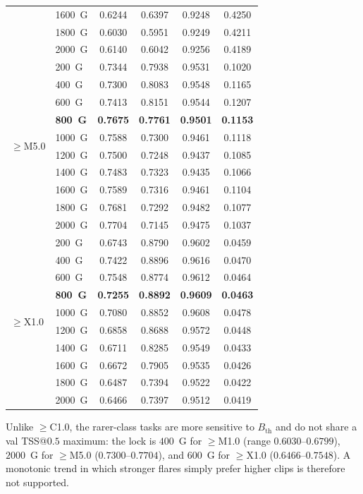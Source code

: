 \documentclass[universe,article,submit,moreauthors]{Definitions/mdpi}
\newif\ifrevision
\newcommand{\add}[1]{\ifrevision\textcolor{blue}{#1}\else#1\fi}
\begin{document}
\begin{table}[!htbp]
\begin{tabular*}{\textwidth}{@{\extracolsep{\fill}}llcccc@{}}
 & 1600~G & 0.6244 & 0.6397 & 0.9248 & 0.4250 \\
 & 1800~G & 0.6030 & 0.5951 & 0.9249 & 0.4211 \\
 & 2000~G & 0.6140 & 0.6042 & 0.9256 & 0.4189 \\
\midrule
\multirow{10}{*}{$\geq$M5.0} & 200~G & 0.7344 & 0.7938 & 0.9531 & 0.1020 \\
 & 400~G & 0.7300 & 0.8083 & 0.9548 & 0.1165 \\
 & 600~G & 0.7413 & 0.8151 & 0.9544 & 0.1207 \\
 & \textbf{800~G} & \textbf{0.7675} & \textbf{0.7761} & \textbf{0.9501} & \textbf{0.1153} \\
 & 1000~G & 0.7588 & 0.7300 & 0.9461 & 0.1118 \\
 & 1200~G & 0.7500 & 0.7248 & 0.9437 & 0.1085 \\
 & 1400~G & 0.7483 & 0.7323 & 0.9435 & 0.1066 \\
 & 1600~G & 0.7589 & 0.7316 & 0.9461 & 0.1104 \\
 & 1800~G & 0.7681 & 0.7292 & 0.9482 & 0.1077 \\
 & 2000~G & 0.7704 & 0.7145 & 0.9475 & 0.1037 \\
\midrule
\multirow{10}{*}{$\geq$X1.0} & 200~G & 0.6743 & 0.8790 & 0.9602 & 0.0459 \\
 & 400~G & 0.7422 & 0.8896 & 0.9616 & 0.0470 \\
 & 600~G & 0.7548 & 0.8774 & 0.9612 & 0.0464 \\
 & \textbf{800~G} & \textbf{0.7255} & \textbf{0.8892} & \textbf{0.9609} & \textbf{0.0463} \\
 & 1000~G & 0.7080 & 0.8852 & 0.9608 & 0.0478 \\
 & 1200~G & 0.6858 & 0.8688 & 0.9572 & 0.0448 \\
 & 1400~G & 0.6711 & 0.8285 & 0.9549 & 0.0433 \\
 & 1600~G & 0.6672 & 0.7905 & 0.9535 & 0.0426 \\
 & 1800~G & 0.6487 & 0.7394 & 0.9522 & 0.0422 \\
 & 2000~G & 0.6466 & 0.7397 & 0.9512 & 0.0419 \\
\bottomrule
\end{tabular*}
\end{table}

\add{Unlike $\geq$C1.0, the rarer-class tasks are more sensitive to $B_{\mathrm{th}}$ and do not share a val TSS@$0.5$ maximum: the lock is $400$~G for $\geq$M1.0 (range $0.6030$--$0.6799$), $2000$~G for $\geq$M5.0 ($0.7300$--$0.7704$), and $600$~G for $\geq$X1.0 ($0.6466$--$0.7548$). A monotonic trend in which stronger flares simply prefer higher clips is therefore not supported.}
\end{document}
